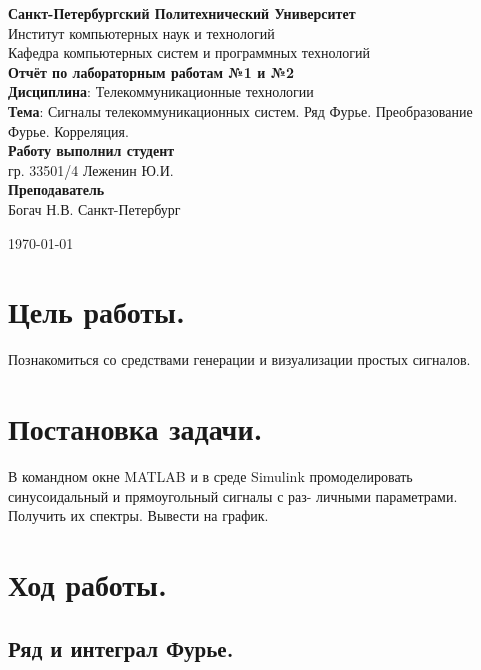 \documentclass[a4paper,14pt]{extarticle}
\begin{document}
\begin{titlepage}
\centering 
{\bfseries Санкт-Петербургский Политехнический Университет} \\
Институт компьютерных наук и технологий \\
Кафедра компьютерных систем и программных технологий \\
\vspace{5cm}
{\centering \textbf{Отчёт по лабораторным работам №1 и №2} \\ 
\vspace{0.15cm}
\textbf{Дисциплина}: Телекоммуникационные технологии \\
\vspace{0.15cm}
\textbf{Тема}: Сигналы телекоммуникационных систем. Ряд Фурье. Преобразование
Фурье. Корреляция.} \\
\vspace{4cm}
\hfill {\bfseries Работу выполнил студент}  \\
\hfill гр. 33501/4 Леженин Ю.И. \\
\hfill {\bfseries Преподаватель}  \\
\hfill Богач Н.В.
\vfill
Санкт-Петербург \\
{\large \today\par}
\end{titlepage}

\section{Цель работы.}

Познакомиться со средствами генерации и визуализации простых сигналов.

\section{Постановка задачи.} 

В командном окне MATLAB и в среде Simulink
промоделировать синусоидальный и прямоугольный сигналы с раз-
личными параметрами. Получить их спектры. Вывести на график.

\section{Ход работы.}

\subsection{Ряд и интеграл Фурье.}
\end{document}
